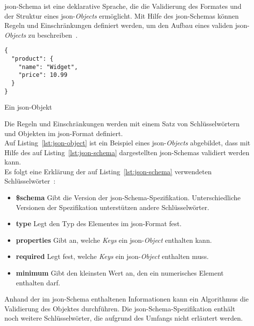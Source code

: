 \acs{json}-Schema ist eine deklarative Sprache, die die Validierung des Formates und der Struktur eines \ac{json}-\textit{Objects} ermöglicht.
Mit Hilfe des \acs{json}-Schemas können Regeln und Einschränkungen definiert werden, um den Aufbau eines validen \ac{json}-\textit{Objects} zu beschreiben~\cite{json-schema-description}.

\begin{listing}[htp]
    \begin{verbatim}
{
  "product": {
    "name": "Widget",
    "price": 10.99
  }
}
      \end{verbatim}
    \caption{Ein \acs{json}-Objekt}
    \label{lst:json-object}
\end{listing}

Die Regeln und Einschränkungen werden mit einem Satz von Schlüsselwörtern und Objekten im \acs{json}-Format definiert.
\\
Auf Listing~\ref{lst:json-object} ist ein Beispiel eines \acs{json}-\textit{Objects} abgebildet, dass mit Hilfe des auf Listing~\ref{lst:json-schema}
dargestellten \acs{json}-Schemas validiert werden kann.
\\
Es folgt eine Erklärung der auf Listing~\ref{lst:json-schema} verwendeten Schlüsselwörter~\cite{json-schema-creation}:

\begin{itemize}
    \setlength\itemsep{-0.5cm}
    \item
          \textbf{\$schema} Gibt die Version der \acs{json}-Schema-Spezifikation. Unterschiedliche Versionen der Spezifikation
          unterstützen andere Schlüsselwörter.
    \item
          \textbf{type} Legt den Typ des Elementes im \acs{json}-Format fest.
    \item
          \textbf{properties} Gibt an, welche \textit{Keys} ein \acs{json}-\textit{Object} enthalten kann.
    \item
          \textbf{required} Legt fest, welche \textit{Keys} ein \acs{json}-\textit{Object}  enthalten muss.
    \item
          \textbf{minimum} Gibt den kleinsten Wert an, den ein numerisches Element enthalten darf.
\end{itemize}

Anhand der im \acs{json}-Schema enthaltenen Informationen kann ein Algorithmus die Validierung des Objektes durchführen.
Die \acs{json}-Schema-Spezifikation enthält noch weitere Schlüsselwörter, die aufgrund des Umfangs nicht erläutert werden.

